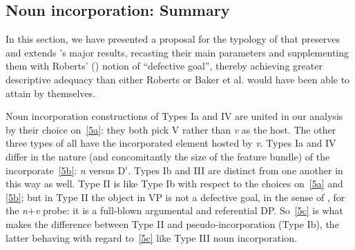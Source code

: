 \documentclass[output=paper]{langsci/langscibook}
\newcommand{\posscite}[1]{\citeauthor{#1}'s \citeyearpar{#1}}
\begin{document}
\begin{refcontext}
\subsection{Noun incorporation: Summary}
In this section, we have presented a proposal for the typology of  that preserves
and extends \posscite{bakeretal05} major results, recasting their main parameters and supplementing
them with Roberts' (\citeyear{Roberts2010}) notion of \enquote{defective goal}, thereby achieving greater descriptive adequacy
than either Roberts or Baker et al. would have been able to attain by themselves.

Noun incorporation constructions of Types Ia and IV are united in our
analysis by their choice on~\eqref{5a}: they both pick V rather than \emph{v} as
the host. The other three types of  all have the incorporated
element hosted by \emph{v}. Types Ia and IV differ in the nature (and
concomitantly the size of the feature bundle) of the incorporate~\eqref{5b}:
\emph{n} versus D$^i$. Types Ib and III are distinct from one another in
this way as well. Type II is like Type Ib with respect to the choices
on~\eqref{5a} and \eqref{5b}; but in Type II the object in VP is not a defective
goal, in the sense of \citet{Roberts2010}, for the \emph{n}+\emph{v} probe: it is
a full-blown argumental and referential DP. So~\eqref{5c} is what makes the
difference between Type II  and pseudo-incorporation (Type
Ib), the latter behaving with regard to~\eqref{5c} like Type III noun
incorporation.


\end{refcontext}
\end{document}
